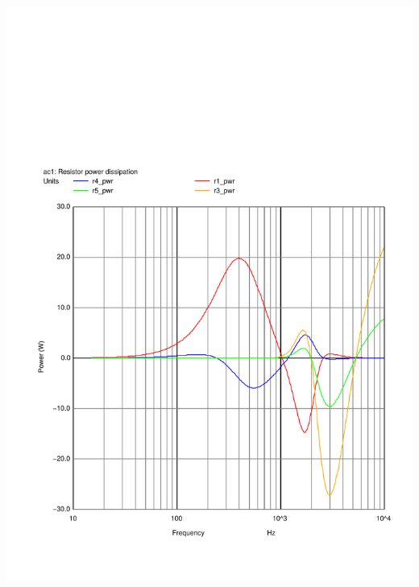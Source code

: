 \documentclass[10pt]{article}
\begin{document}
\begin{multicols}{2}
	\includegraphics[scale=0.35,page=1]{../crossover/ngspice/r_pwr.pdf}

\end{multicols}
\end{document}
